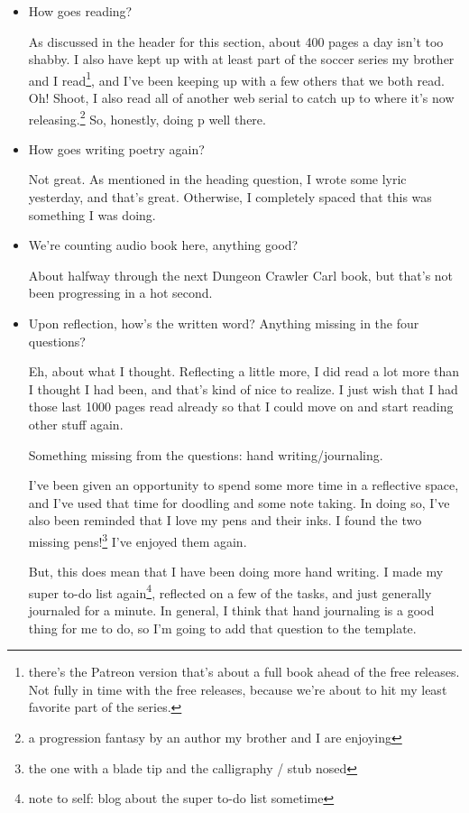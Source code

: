 \documentclass[12pt]{article}
\renewcommand{\,}{\textsuperscript{,}}
\begin{document}
\begin{itemize}
\begin{itemize}
\begin{itemize}
\item How goes reading?

As discussed in the header for this section, about 400 pages a day isn't too shabby.
I also have kept up with at least part of the soccer series my brother and I read\footnote{there's the Patreon version that's about a full book ahead of the free releases. Not fully in time with the free releases, because we're about to hit my least favorite part of the series.}, and I've been keeping up with a few others that we both read.
Oh! Shoot, I also read all of another web serial to catch up to where it's now releasing.\footnote{a progression fantasy by an author my brother and I are enjoying}
So, honestly, doing p well there.

\item How goes writing poetry again?

Not great.
As mentioned in the heading question, I wrote some lyric yesterday, and that's great.
Otherwise, I completely spaced that this was something I was doing.

\item We're counting audio book here, anything good?

About halfway through the next Dungeon Crawler Carl book, but that's not been progressing in a hot second.

\item Upon reflection, how's the written word? Anything missing in the four questions?

Eh, about what I thought.
Reflecting a little more, I did read a lot more than I thought I had been, and that's kind of nice to realize.
I just wish that I had those last 1000 pages read already so that I could move on and start reading other stuff again.

Something missing from the questions: hand writing/journaling.

I've been given an opportunity to spend some more time in a reflective space, and I've used that time for doodling and some note taking.
In doing so, I've also been reminded that I love my pens and their inks.
I found the two missing pens!\footnote{the one with a blade tip and the calligraphy / stub nosed}
I've enjoyed them again.

But, this does mean that I have been doing more hand writing.
I made my super to-do list again\footnote{note to self: blog about the super to-do list sometime}, reflected on a few of the tasks, and just generally journaled for a minute.
In general, I think that hand journaling is a good thing for me to do, so I'm going to add that question to the template.


\end{itemize}
\end{itemize}
\end{itemize}
\end{document}
